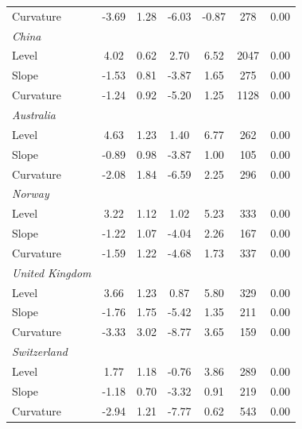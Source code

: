 \documentclass[12pt,bibliography=totoc]{article}
\begin{document}
\begin{table}[H]
\begin{tabular}{l c c c c c c}
\medskip													
Curvature					&	-3.69	&	1.28	&	-6.03	&	-0.87	&	278	&	0.00	\\
\textit{China}				&		&		&		&		&		&		\\
Level						&	4.02	&	0.62	&	2.70	&	6.52 &	2047	&	0.00	\\
Slope				&	-1.53	&	0.81	&	-3.87	&	1.65 &	275	&	0.00	\\
\medskip													
Curvature					&	-1.24	&	0.92	&	-5.20	&	1.25&	1128	&	0.00	\\
\textit{Australia}			&		&		&		&		&		&		\\
Level						&	4.63	&	1.23	&	1.40	&	6.77	&	262	&	0.00	\\
Slope				&	-0.89	&	0.98	&	-3.87	&	1.00	&	105	&	0.00	\\
\medskip													
Curvature					&	-2.08	&	1.84	&	-6.59	&	2.25	&	296	&	0.00	\\
\textit{Norway}				&		&		&		&		&		&		\\
Level						&	3.22	&	1.12	&	1.02	&	5.23	&	333	&	0.00	\\
Slope				&	-1.22	&	1.07	&	-4.04	&	2.26	&	167	&	0.00	\\
\medskip													
Curvature					&	-1.59	&	1.22	&	-4.68	&	1.73	&	337	&	0.00	\\
\textit{United Kingdom}		&		&		&		&		&		&		\\
Level						&	3.66	&	1.23	&	0.87	&	5.80	&	329	&	0.00	\\
Slope				&	-1.76	&	1.75	&	-5.42	&	1.35	&	211	&	0.00	\\
\medskip													
Curvature					&	-3.33	&	3.02	&	-8.77	&	3.65	&	159	&	0.00	\\
\textit{Switzerland}				&		&		&		&		&		&		\\
Level						&	1.77	&	1.18	&	-0.76	&	3.86	&	289	&	0.00	\\
Slope				&	-1.18	&	0.70	&	-3.32	&	0.91	&	219	&	0.00	\\
Curvature					&	-2.94	&	1.21	&	-7.77	&	0.62	&	543	&	0.00	\\

\hline%
\end{tabular}
\label{table:nonlin}%
\end{table}

\end{document}
